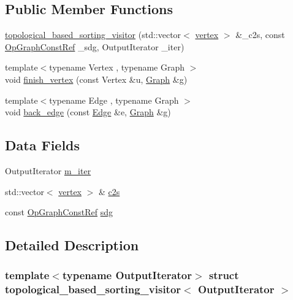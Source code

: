 \subsection*{Public Member Functions}
\begin{DoxyCompactItemize}
\item 
\hyperlink{structtopological__based__sorting__visitor_a6c4cae5c275b7c30bc37362e3a428d3e}{topological\+\_\+based\+\_\+sorting\+\_\+visitor} (std\+::vector$<$ \hyperlink{graph_8hpp_abefdcf0544e601805af44eca032cca14}{vertex} $>$ \&\+\_\+c2s, const \hyperlink{op__graph_8hpp_a9a0b240622c47584bee6951a6f5de746}{Op\+Graph\+Const\+Ref} \+\_\+sdg, Output\+Iterator \+\_\+iter)
\item 
{\footnotesize template$<$typename Vertex , typename Graph $>$ }\\void \hyperlink{structtopological__based__sorting__visitor_ae5d12d2402e172f3a6a9d8ebfd279739}{finish\+\_\+vertex} (const Vertex \&u, \hyperlink{structGraph}{Graph} \&g)
\item 
{\footnotesize template$<$typename Edge , typename Graph $>$ }\\void \hyperlink{structtopological__based__sorting__visitor_abd9e4aba1cc1762372f6eda9c3c873fb}{back\+\_\+edge} (const \hyperlink{structEdge}{Edge} \&e, \hyperlink{structGraph}{Graph} \&g)
\end{DoxyCompactItemize}
\subsection*{Data Fields}
\begin{DoxyCompactItemize}
\item 
Output\+Iterator \hyperlink{structtopological__based__sorting__visitor_a15de11b0269d2fc090b7000ae77e41a4}{m\+\_\+iter}
\item 
std\+::vector$<$ \hyperlink{graph_8hpp_abefdcf0544e601805af44eca032cca14}{vertex} $>$ \& \hyperlink{structtopological__based__sorting__visitor_a95d01b5231b8acf2c9bc7eeb2fc29ac7}{c2s}
\item 
const \hyperlink{op__graph_8hpp_a9a0b240622c47584bee6951a6f5de746}{Op\+Graph\+Const\+Ref} \hyperlink{structtopological__based__sorting__visitor_a62c7d05e0ca7b5b1f6d977f6e9384c34}{sdg}
\end{DoxyCompactItemize}


\subsection{Detailed Description}
\subsubsection*{template$<$typename Output\+Iterator$>$\newline
struct topological\+\_\+based\+\_\+sorting\+\_\+visitor$<$ Output\+Iterator $>$}




